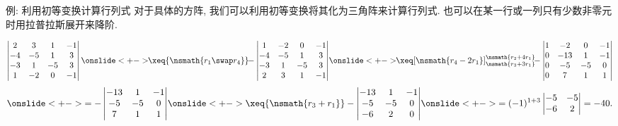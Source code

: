 \begin{frame}{例: 利用初等变换计算行列式}
	\onslide<+->
	对于具体的方阵, 我们可以利用初等变换将其化为三角阵来计算行列式.
	\onslide<+->
	也可以在某一行或一列只有少数非零元时用拉普拉斯展开来降阶.
	\onslide<+->
	\begin{example}
		\[\begin{vmatrix}
			 2& 3& 1&-1\\
			-4&-5& 1& 3\\
			-3& 1&-5& 3\\
			 1&-2& 0&-1
		\end{vmatrix}
		\onslide<+->{\!\!\xeq{\nsmath{r_1\swap r_4}}\!\!
		-\begin{vmatrix}
			1&-2& 0&-1\\
		 -4&-5& 1& 3\\
		 -3& 1&-5& 3\\
		  2& 3& 1&-1
		\end{vmatrix}}
		\onslide<+->{\!\!\xeq[\nsmath{r_4-2r_1}]{\substack{\nsmath{r_2+4r_1}\\\nsmath{r_3+3r_1}}}\!\!
		-\begin{vmatrix}
			1&-2& 0&-1\\
		  0&-13& 1&-1\\
		  0&-5&-5&0\\
		  0& 7& 1&1
		\end{vmatrix}}\]
		\[\onslide<+->{=-\begin{vmatrix}
			-13& 1&-1\\
			-5&-5&0\\
				7& 1&1
			\end{vmatrix}}
		\onslide<+->{\xeq{\nsmath{r_3+r_1}}
		-\begin{vmatrix}
			-13& 1&-1\\
			-5&-5&0\\
			-6& 2&0
		\end{vmatrix}}
		\onslide<+->{=(-1)^{1+3}\begin{vmatrix}
			-5&-5\\-6&2
		\end{vmatrix}=-40.}\]
	\end{example}
\end{frame}


